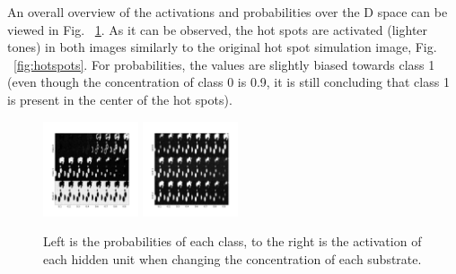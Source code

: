 \documentclass{article}
\begin{document}
%
An overall overview of the activations and probabilities over the D space can be viewed in Fig. ~\ref{fig:activations}. As it can be observed, the hot spots are activated (lighter tones) in both images similarly to the original hot spot simulation image, Fig. ~\ref{fig:hotspots}. For probabilities, the values are slightly biased towards class 1 (even though the concentration of class 0 is 0.9, it is still concluding that class 1 is present	in the center of the hot spots). %

\begin{figure}[H]
	\centering
	\includegraphics[width=0.25\textwidth]{DNN_prop_im.png} \hspace*{-.5cm}
	\includegraphics[width=0.25\textwidth]{DNN_sigmoid_im.png}
	\caption{Left is the probabilities of each class, to the right is the activation of each hidden unit when changing the concentration of each substrate.}
    \label{fig:activations}
\end{figure}
\end{document}

